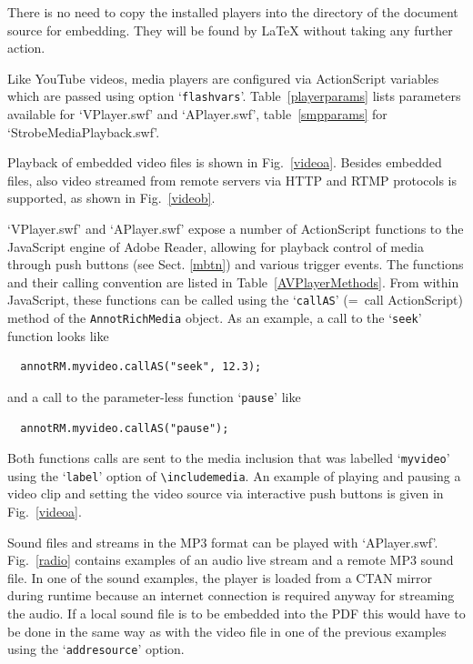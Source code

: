 \documentclass[a4paper]{article}
\begin{document}
There is no need to copy the installed players into the directory of the document source for embedding. They will be found by \LaTeX{} without taking any further action.

Like YouTube videos, media players are configured via ActionScript variables which are passed using option `\verb+flashvars+'. Table~\ref{playerparams} lists parameters available for `VPlayer.swf' and `APlayer.swf', table~\ref{smpparams} for `StrobeMediaPlayback.swf'.

Playback of embedded video files is shown in Fig.~\ref{videoa}. Besides embedded files, also video streamed from remote servers via HTTP and RTMP protocols is supported, as shown in Fig.~\ref{videob}.

`VPlayer.swf' and `APlayer.swf' expose a number of ActionScript functions to the JavaScript engine of Adobe Reader, allowing for playback control of media through push buttons (see Sect. \ref{mbtn}) and various trigger events. The functions and their calling convention are listed in Table~\ref{AVPlayerMethods}. From within JavaScript, these functions can be called using the `\verb+callAS+' (=~call ActionScript) method of the \verb+AnnotRichMedia+ object. As an example, a call to the `\verb+seek+' function looks like
\begin{verbatim}
  annotRM.myvideo.callAS("seek", 12.3);
\end{verbatim}
and a call to the parameter-less function `\verb+pause+' like
\begin{verbatim}
  annotRM.myvideo.callAS("pause");
\end{verbatim}
Both functions calls are sent to the media inclusion that was labelled `\verb+myvideo+' using the `\verb+label+' option of \verb+\includemedia+. An example of playing and pausing a video clip and setting the video source via interactive push buttons is given in Fig.~\ref{videoa}.

Sound files and streams in the MP3 format can be played with `APlayer.swf'. Fig.~\ref{radio} contains examples of an audio live stream and a remote MP3 sound file. In one of the sound examples, the player is loaded from a CTAN mirror during runtime because an internet connection is required anyway for streaming the audio. If a local sound file is to be embedded into the PDF this would have to be done in the same way as with the video file in one of the previous examples using the `\verb+addresource+' option.
\end{document}
